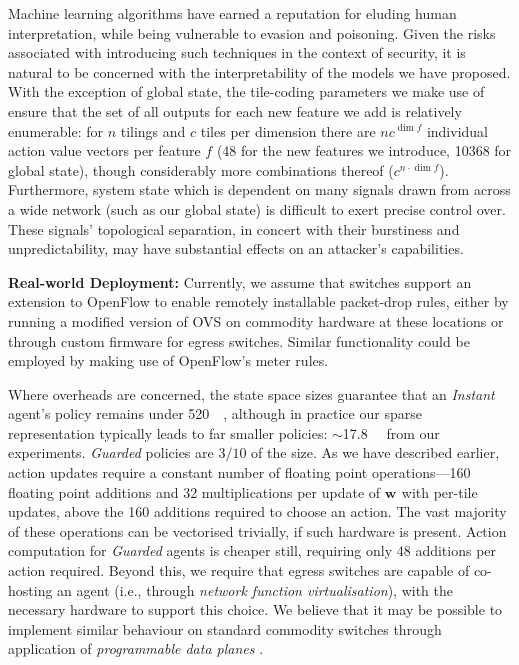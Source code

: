 \documentclass[10pt, times, comsoc]{IEEEtran}
\newcommand{\wvec}[1]{\ensuremath{\bm{w}_{#1}}}
\newcommand{\fakepara}[1]{\noindent\textbf{#1:}}
\begin{document}
Machine learning algorithms have earned a reputation for eluding human interpretation, while being vulnerable to evasion and poisoning.
Given the risks associated with introducing such techniques in the context of security, it is natural to be concerned with the interpretability of the models we have proposed.
With the exception of global state, the tile-coding parameters we make use of ensure that the set of all outputs for each new feature we add is relatively enumerable: for $n$ tilings and $c$ tiles per dimension there are $nc^{\dim{f}}$ individual action value vectors per feature $f$ (\num{48} for the new features we introduce, \num{10368} for global state), though considerably more combinations thereof ($c^{n \cdot \dim{f}}$).
Furthermore, system state which is dependent on many signals drawn from across a wide network (such as our global state) is difficult to exert precise control over.
These signals' topological separation, in concert with their burstiness and unpredictability, may have substantial effects on an attacker's capabilities.

\fakepara{Real-world Deployment}
Currently, we assume that switches support an extension to OpenFlow to enable remotely installable packet-drop rules, either by running a modified version of OVS on commodity hardware at these locations or through custom firmware for egress switches.
Similar functionality could be employed by making use of OpenFlow's meter rules.

Where overheads are concerned, the state space sizes guarantee that an \emph{Instant} agent's policy remains under \SI{520}{\kibi\byte}, although in practice our sparse representation typically leads to far smaller policies: $\sim$\SI{17.8}{\kibi\byte} from our experiments.
\emph{Guarded} policies are $3/10$ of the size.
As we have described earlier, action updates require a constant number of floating point operations---\num{160} floating point additions and \num{32} multiplications per update of $\wvec{}$ with per-tile updates, above the \num{160} additions required to choose an action.
The vast majority of these operations can be vectorised trivially, if such hardware is present.
Action computation for \emph{Guarded} agents is cheaper still, requiring only \num{48} additions per action required.
Beyond this, we require that egress switches are capable of co-hosting an agent (i.e., through \emph{network function virtualisation}), with the necessary hardware to support this choice.
We believe that it may be possible to implement similar behaviour on standard commodity switches through application of \emph{programmable data planes} \cite{DBLP:conf/ancs/JouetP17}.
\end{document}
